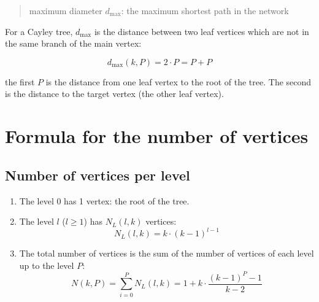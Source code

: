 \documentclass{article}
\newcommand{\Sum}[3]{\ensuremath{\displaystyle\sum\limits_{#1}^{#2} #3}}
\begin{document}
\begin{quotation}
	maximum diameter $d_{\max}$: the maximum shortest path in the network
\end{quotation}

For a Cayley tree, $d_{\max}$ is the distance between two leaf vertices which are not in the same branch of the main vertex:

\begin{equation}
	d_{\max}(k, P) = 2 \cdot P = P + P
\end{equation}

the first $P$ is the distance from one leaf vertex to the root of the tree. The second is the distance to the target vertex (the other leaf vertex).

\section{Formula for the number of vertices}

\subsection{Number of vertices per level}

\begin{enumerate}
	\item The level 0 has 1 vertex: the root of the tree.
	\item The level $l$ ($l \geq 1$) has $N_L(l, k)$ vertices:
		\begin{equation}
			N_L(l, k) = k \cdot {\left(k - 1\right)}^{l - 1}
		\end{equation}
	\item The total number of vertices is the sum of the number of vertices of each level up to the level $P$:
		\begin{equation}
			N(k,P) = \Sum{i = 0}{P}{N_L(l,k)} = 1 + k \cdot \dfrac{{\left(k - 1\right)}^{P} - 1}{k - 2}
		\end{equation}
\end{enumerate}
\end{document}
